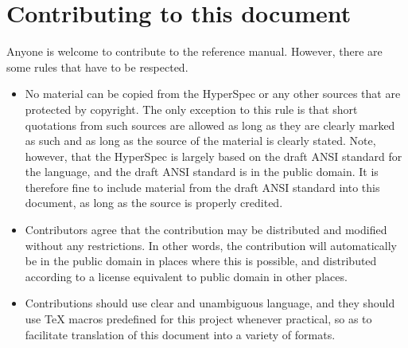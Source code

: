 \chapter{Contributing to this document}
\label{app-contributing}

Anyone is welcome to contribute to the \commonlisp{} reference manual.
However, there are some rules that have to be respected.

\begin{itemize}
\item No material can be copied from the HyperSpec or any other
  sources that are protected by copyright.  The only exception to this
  rule is that short quotations from such sources are allowed as long
  as they are clearly marked as such and as long as the source of the
  material is clearly stated.  Note, however, that the HyperSpec is
  largely based on the draft ANSI standard for the \commonlisp{}
  language, and the draft ANSI standard is in the public domain.  It
  is therefore fine to include material from the draft ANSI standard
  into this document, as long as the source is properly credited.
\item Contributors agree that the contribution may be distributed and
  modified without any restrictions.  In other words, the contribution
  will automatically be in the public domain in places where this is
  possible, and distributed according to a license equivalent to
  public domain in other places. 
\item Contributions should use clear and unambiguous language, and
  they should use TeX macros predefined for this project whenever
  practical, so as to facilitate translation of this document into a
  variety of formats. 
\end{itemize}
